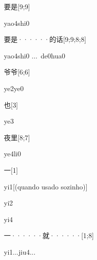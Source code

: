 \begin{verbete}{要是}[9;9]
\begin{pronuncia}{yao4shi0}
\end{pronuncia}
\end{verbete}

\begin{verbete}{要是······的话}[9;9;8;8]
\begin{pronuncia}[\\]{yao4shi0 ...\  de0hua0}
\end{pronuncia}
\end{verbete}

\begin{verbete}[ye2ye0]{爷爷}[6;6]
\begin{pronuncia}{ye2ye0}
\end{pronuncia}
\end{verbete}

\begin{verbete}[ye3]{也}[3]
\begin{pronuncia}{ye3}
\end{pronuncia}
\end{verbete}

\begin{verbete}[ye4li0]{夜里}[8;7]
\begin{pronuncia}{ye4li0}
\end{pronuncia}
\end{verbete}

\begin{verbete}[yi1]{一}[1]
\begin{pronuncia}[\\]{yi1}[(quando usado sozinho)]
\end{pronuncia}
\begin{pronuncia}{yi2}
\end{pronuncia}
\begin{pronuncia}{yi4}
\end{pronuncia}
\end{verbete}

\begin{verbete}[yi1...jiu4...]{一······就······}[1;8]
\begin{pronuncia}{yi1...jiu4...}
\end{pronuncia}
\end{verbete}

